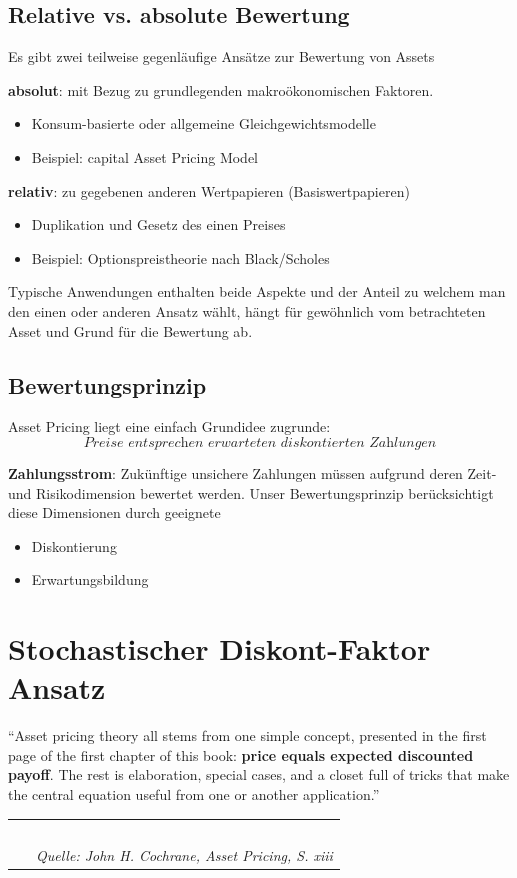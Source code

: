 \documentclass[12pt]{extreport} %
\theoremstyle{named}
\theoremstyle{nnamed}
\theoremstyle{itshape}
\theoremstyle{normal}
\begin{document}
\section*{Relative vs. absolute Bewertung}
Es gibt zwei teilweise gegenläufige Ansätze zur Bewertung von Assets
\begin{description}
	\item \textbf{absolut}: mit Bezug zu grundlegenden makroökonomischen Faktoren.
		\begin{itemize}
			\item Konsum-basierte oder allgemeine Gleichgewichtsmodelle
			\item Beispiel: capital Asset Pricing Model
		\end{itemize}
	\item \textbf{relativ}: zu gegebenen anderen Wertpapieren (Basiswertpapieren)
		\begin{itemize}
			\item Duplikation und Gesetz des einen Preises
			\item Beispiel: Optionspreistheorie nach Black/Scholes
		\end{itemize}
\end{description}
Typische Anwendungen enthalten beide Aspekte und der Anteil zu welchem man den einen oder anderen Ansatz  wählt, hängt für gewöhnlich vom betrachteten Asset und Grund für die Bewertung ab.

\section*{Bewertungsprinzip}
Asset Pricing liegt eine einfach Grundidee zugrunde:
$$ \textit{Preise entsprechen erwarteten diskontierten Zahlungen} $$ 

\textbf{Zahlungsstrom}: Zukünftige unsichere Zahlungen müssen aufgrund deren Zeit- und Risikodimension bewertet werden. Unser Bewertungsprinzip berücksichtigt diese Dimensionen durch geeignete
\begin{itemize}
	\item Diskontierung
	\item Erwartungsbildung
\end{itemize}

\chapter{Stochastischer Diskont-Faktor Ansatz}

\enquote{Asset pricing theory all stems from one simple concept, presented in the first page of the first chapter of this book: \textbf{price equals expected discounted payoff}. The rest is elaboration, special cases, and a closet full of tricks that make the central equation useful from one or another application.} ~\\ 
	\begin{tabular}{lr} ~\\
  		\hspace{6.35cm} & \textit{Quelle: John H. Cochrane, Asset Pricing, S. xiii}
	\end{tabular} ~\\ ~\bigskip
\end{document}
